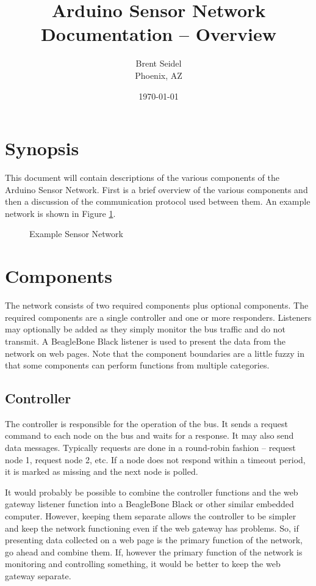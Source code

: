 \documentclass[10pt, openany, draft]{article}
\title{Arduino Sensor Network Documentation -- Overview}
\author{Brent Seidel \\ Phoenix, AZ}
\date{ \today }
\begin{document}
\maketitle
\section{Synopsis}
This document will contain descriptions of the various components of the Arduino Sensor Network.  First is a brief overview of the various components and then a discussion of the communication protocol used between them.  An example network is shown in Figure \ref{fig:Example}.

\begin{figure}
  \centering
  
  \caption{Example Sensor Network}
  \label{fig:Example}
\end{figure}

\section{Components}
The network consists of two required components plus optional components.  The required components are a single controller and one or more responders.  Listeners may optionally be added as they simply monitor the bus traffic and do not transmit.  A BeagleBone Black listener is used to present the data from the network on web pages.  Note that the component boundaries are a little fuzzy in that some components can perform functions from multiple categories.

\subsection{Controller}
The controller is responsible for the operation of the bus.  It sends a request command to each node on the bus and waits for a response.  It may also send data messages.  Typically requests are done in a round-robin fashion -- request node 1, request node 2, etc.  If a node does not respond within a timeout period, it is marked as missing and the next node is polled.

It would probably be possible to combine the controller functions and the web gateway listener function into a BeagleBone Black or other similar embedded computer.  However, keeping them separate allows the controller to be simpler and keep the network functioning even if the web gateway has problems.  So, if presenting data collected on a web page is the primary function of the network, go ahead and combine them.  If, however the primary function of the network is monitoring and controlling something, it would be better to keep the web gateway separate.
\end{document}
